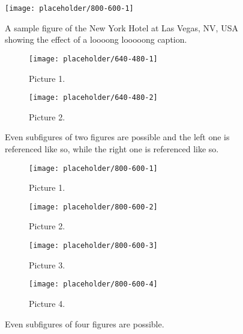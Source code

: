 \begin{figure}
    \centering
    \texttt{[image: placeholder/800-600-1]}
    \caption{A sample figure of the New York Hotel at Las Vegas, NV, USA showing the effect of a loooong looooong caption.}
    \label{fig:sample-figure}
\end{figure}

\begin{figure}
    \centering
    \begin{subfigure}[b]{0.49\textwidth}
        \texttt{[image: placeholder/640-480-1]}
        \caption{Picture 1.}
        \label{fig:subfigures-two:1}
    \end{subfigure}
    \hfill
    \begin{subfigure}[b]{0.49\textwidth}
        \texttt{[image: placeholder/640-480-2]}
        \caption{Picture 2.}
        \label{fig:subfigures-two:2}
    \end{subfigure}
    
    \caption{Even subfigures of two figures are possible and the left one is referenced like  so, while the right one is referenced like  so.}
    \label{fig:subfigures-two}
\end{figure}

\begin{figure}
    \centering
    \begin{subfigure}[b]{0.49\textwidth}
        \texttt{[image: placeholder/800-600-1]}
        \caption{Picture 1.}
        \label{fig:subfigures-four:1}
    \end{subfigure}
    \hfill
    \begin{subfigure}[b]{0.49\textwidth}
        \texttt{[image: placeholder/800-600-2]}
        \caption{Picture 2.}
        \label{fig:subfigures-four:2}
    \end{subfigure}
    \hfill
    \begin{subfigure}[b]{0.49\textwidth}
        \texttt{[image: placeholder/800-600-3]}
        \caption{Picture 3.}
        \label{fig:subfigures-four:3}
    \end{subfigure}
    \hfill
    \begin{subfigure}[b]{0.49\textwidth}
        \texttt{[image: placeholder/800-600-4]}
        \caption{Picture 4.}
        \label{fig:subfigures-four:4}
    \end{subfigure}
    
    \caption{Even subfigures of four figures are possible.}
    \label{fig:subfigures-four}
\end{figure}


